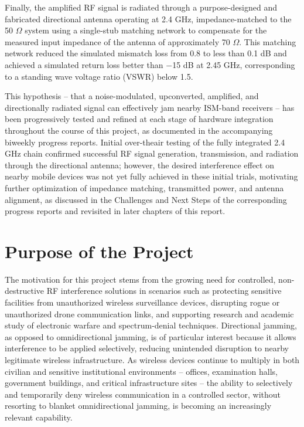 \documentclass[12pt,a4paper]{report}
\begin{document}
	\vspace{0.5cm}
	
Finally, the amplified RF signal is radiated through a purpose-designed and fabricated directional antenna operating at 2.4 GHz, impedance-matched to the 50 $\Omega$ system using a single-stub matching network to compensate for the measured input impedance of the antenna of approximately 70 $\Omega$. This matching network reduced the simulated mismatch loss from 0.8 to less than 0.1 dB and achieved a simulated return loss better than $-$15 dB at 2.45 GHz, corresponding to a standing wave voltage ratio (VSWR) below 1.5.
	
	\vspace{0.5cm}
	
	This hypothesis – that a noise-modulated, upconverted, amplified, and directionally radiated signal can effectively jam nearby ISM-band receivers – has been progressively tested and refined at each stage of hardware integration throughout the course of this project, as documented in the accompanying biweekly progress reports. Initial over-theair testing of the fully integrated 2.4 GHz chain confirmed successful RF signal generation, transmission, and radiation through the directional antenna; however, the desired interference effect on nearby mobile devices was not yet fully achieved in these initial trials, motivating further optimization of impedance matching, transmitted power, and antenna alignment, as discussed in the Challenges and Next Steps of the corresponding progress reports and revisited in later chapters of this report.   
	
	\section{Purpose of the Project}
	
	The motivation for this project stems from the growing need for controlled, non-destructive RF interference solutions in scenarios such as protecting sensitive facilities from unauthorized wireless surveillance devices, disrupting rogue or unauthorized drone communication links, and supporting research and academic study of electronic warfare and spectrum-denial techniques. Directional jamming, as opposed to omnidirectional jamming, is of particular interest because it allows interference to be applied selectively, reducing unintended disruption to nearby legitimate wireless infrastructure. As wireless devices continue to multiply in both civilian and sensitive institutional environments – offices, examination halls, government buildings, and critical infrastructure sites – the ability to selectively and temporarily deny wireless communication in a controlled sector, without resorting to blanket omnidirectional jamming, is becoming an increasingly relevant capability.
	
\end{document}
